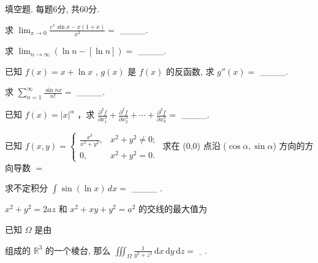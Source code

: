 \par{}
填空题. 每题6分, 共60分.\par
求  $\lim_{x\to0}\frac{e^{x}\sin x-x(1+x)}{x^{3}}=$  \_\_\_\_.\par
求  $\lim_{n\to\infty}(\ln n - [\ln n]) =$  \_\_\_\_.\par
已知  $f(x) = x + \ln x$ ,  $g(x)$  是  $f(x)$  的反函数, 求  $g''(x) =$  \_\_\_\_.\par
求  $\sum_{n=1}^{\infty}\frac{\sin nx}{n!}=$  \_\_\_\_.\par
已知  $f(x)=|x|^{\alpha}$ ，求  $\frac{\partial^{2}f}{\partial x_{1}^{2}}+\frac{\partial^{2}f}{\partial x_{2}^{2}}+\cdots+\frac{\partial^{2}f}{\partial x_{n}^{2}}=$  \_\_\_\_.\par
已知 $f(x, y) = \begin{cases} \frac{x^3}{x^2 + y^2}, & x^2 + y^2 \neq 0; \\ 0, & x^2 + y^2 = 0. \end{cases}$ 求在 (0,0) 点沿 ($\cos \alpha, \sin \alpha$) 方向的方向导数 $=$\par
求不定积分  $\int \sin(\ln x) \, dx =$ \_\_\_\_ .\par
$x^{2} + y^{2} = 2az$ 和 $x^{2} + xy + y^{2} = a^{2}$ 的交线的最大值为\par
\par{}
已知 $\Omega$ 是由\par
\nopagebreak[4]
组成的 $\mathbb{R}^3$ 的一个棱台, 那么 $\iiint_{\Omega} \frac{1}{y^2 + z^2} \, \mathrm{d}x \, \mathrm{d}y \, \mathrm{d}z = \underline{\quad}$.\par
